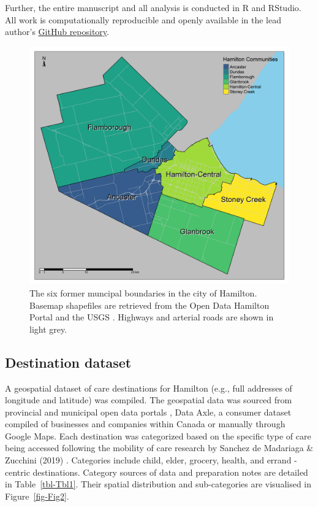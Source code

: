 \documentclass[
  authoryear,
  preprint,
  3p]{elsarticle}
\begin{document}
Further, the entire manuscript and all analysis is conducted in R and
RStudio. All work is computationally reproducible and openly available
in the lead author's
\href{https://github.com/soukhova/Care-Destinations}{GitHub repository}.

\begin{figure}

{\centering \includegraphics[width=6.25in,height=\textheight]{figures/Fig1-boundaries.png}

}

\caption{\label{fig-Fig1}The six former muncipal boundaries in the city
of Hamilton. Basemap shapefiles are retrieved from the Open Data
Hamilton Portal \citep{opendatahamiltonCityBoundary2023} and the USGS
\citep{greatlakesUSGS2010}. Highways and arterial roads are shown in
light grey.}

\end{figure}

\hypertarget{destination-dataset}{%
\subsection{Destination dataset}\label{destination-dataset}}

A geospatial dataset of care destinations for Hamilton (e.g., full
addresses of longitude and latitude) was compiled. The geospatial data
was sourced from provincial and municipal open data portals
\citep{governmentofontarioOntarioDataCatalogue2023, cityofhamiltonOpenData2023},
Data Axle, a consumer dataset compiled of businesses and companies
within Canada \citep{axledataConsumerData2023} or manually through
Google Maps. Each destination was categorized based on the specific type
of care being accessed following the mobility of care research by
Sanchez de Madariaga \& Zucchini (2019)
\citep{sanchezdemadariagaMeasuringMobilitiesCare2019}. Categories
include child, elder, grocery, health, and errand -centric destinations.
Category sources of data and preparation notes are detailed in
Table~\ref{tbl-Tbl1}. Their spatial distribution and sub-categories are
visualised in Figure~\ref{fig-Fig2}.
\end{document}
